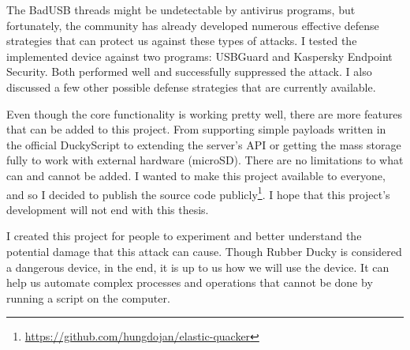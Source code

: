 The BadUSB threads might be undetectable by antivirus programs, but fortunately, the community has already developed numerous effective defense strategies that can protect us against these types of attacks. I tested the implemented device against two programs: USBGuard and Kaspersky Endpoint Security. Both performed well and successfully suppressed the attack. I also discussed a few other possible defense strategies that are currently available. 

Even though the core functionality is working pretty well, there are more features that can be added to this project. From supporting simple payloads written in the official DuckyScript to extending the server's API or getting the mass storage fully to work with external hardware (microSD). There are no limitations to what can and cannot be added. I wanted to make this project available to everyone, and so I decided to publish the source code publicly\footnote{\url{https://github.com/hungdojan/elastic-quacker}}. I hope that this project's development will not end with this thesis.

I created this project for people to experiment and better understand the potential damage that this attack can cause. Though Rubber Ducky is considered a dangerous device, in the end, it is up to us how we will use the device. It can help us automate complex processes and operations that cannot be done by running a script on the computer.
